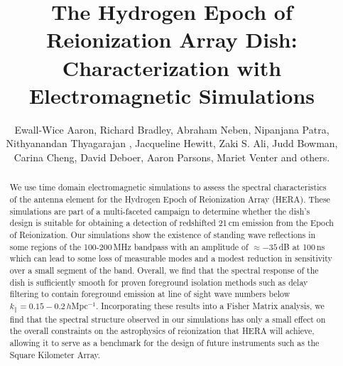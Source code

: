 \documentclass[twocolumn]{emulateapj}
\begin{document}
\title{The Hydrogen Epoch of Reionization Array Dish: Characterization with Electromagnetic Simulations}
\author{
Ewall-Wice Aaron,
Richard Bradley,
Abraham Neben,
Nipanjana Patra,
Nithyanandan Thyagarajan ,
Jacqueline Hewitt,
Zaki S. Ali,
Judd Bowman,
Carina Cheng,
David Deboer,
Aaron Parsons,
Mariet Venter
and others.
}

\begin{abstract}
We use time domain electromagnetic simulations to assess the spectral characteristics of the antenna element for the Hydrogen Epoch of Reionization Array (HERA). These simulations are part of a multi-faceted campaign to determine whether the dish's design is suitable for obtaining a detection of redshifted 21\,cm emission from the Epoch of Reionization. Our simulations show the existence of standing wave reflections in some regions of the 100-200\,MHz bandpass with an amplitude of $\approx -35$\,dB at 100\,ns which can lead to some loss of measurable modes and a modest reduction in sensitivity over a small segment of the band. Overall, we find that the spectral response of the dish is sufficiently smooth for proven foreground isolation methods such as delay filtering to contain foreground emission at line of sight wave numbers below $k_\parallel = 0.15-0.2$\,$h$Mpc$^{-1}$. Incorporating these results into a Fisher Matrix analysis, we find that the spectral structure observed in our simulations has only a small effect on the overall constraints on the astrophysics of reionization that HERA will achieve, allowing it to serve as a benchmark for the design of future instruments such as the Square Kilometer Array. 
\end{abstract}
\end{document}
